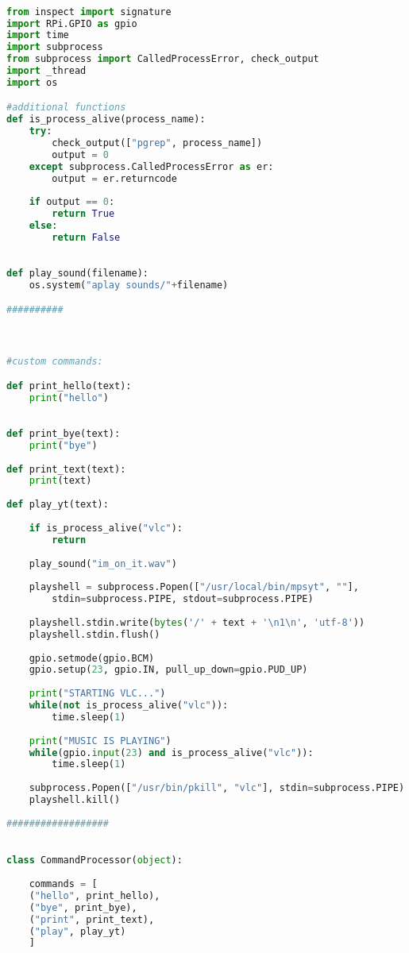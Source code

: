 \begin{lstlisting}[language=Python]

from inspect import signature
import RPi.GPIO as gpio
import time
import subprocess
from subprocess import CalledProcessError, check_output
import _thread
import os

#additional functions
def is_process_alive(process_name):
    try:
        check_output(["pgrep", process_name])
        output = 0
    except subprocess.CalledProcessError as er:
        output = er.returncode
        
    if output == 0:
        return True
    else:
        return False
        
        
def play_sound(filename):
    os.system("aplay sounds/"+filename)

##########



#custom commands:

def print_hello(text):
    print("hello")
    
    
def print_bye(text):
    print("bye")
    
def print_text(text):
	print(text)
	
def play_yt(text):
    
    if is_process_alive("vlc"):
        return
        
    play_sound("im_on_it.wav")
    
    playshell = subprocess.Popen(["/usr/local/bin/mpsyt", ""],
		stdin=subprocess.PIPE, stdout=subprocess.PIPE)
    
    playshell.stdin.write(bytes('/' + text + '\n1\n', 'utf-8'))
    playshell.stdin.flush()
    
    gpio.setmode(gpio.BCM)
    gpio.setup(23, gpio.IN, pull_up_down=gpio.PUD_UP)
    
    print("STARTING VLC...")
    while(not is_process_alive("vlc")):
        time.sleep(1)
        
    print("MUSIC IS PLAYING")    
    while(gpio.input(23) and is_process_alive("vlc")):
        time.sleep(1)
        
    subprocess.Popen(["/usr/bin/pkill", "vlc"], stdin=subprocess.PIPE)
    playshell.kill()
	
##################
	

class CommandProcessor(object):
	
    commands = [
    ("hello", print_hello),
    ("bye", print_bye),
    ("print", print_text),
    ("play", play_yt)
    ]
    

\end{lstlisting}
